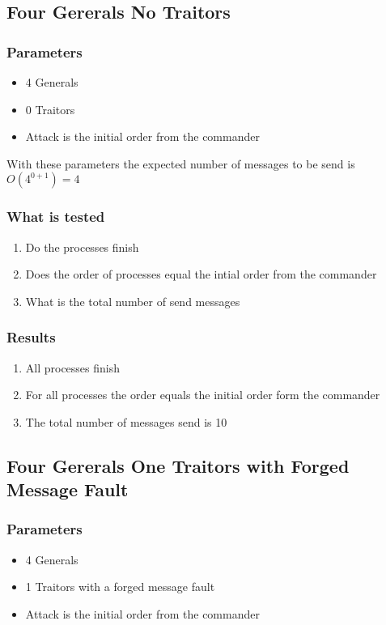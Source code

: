\documentclass[a4paper, notitlepage]{article}
\begin{document}
\subsection{Four Gererals No Traitors}

\subsubsection*{Parameters}
\begin{itemize}
\item 4 Generals
\item 0 Traitors
\item Attack is the initial order from the commander
\end{itemize}

With these parameters the expected number of messages to be send is \(O(4^{0+1}) = 4\)

\subsubsection*{What is tested}
\begin{enumerate}
\item Do the processes finish
\item Does the order of processes equal the intial order from the commander
\item What is the total number of send messages
\end{enumerate}

\subsubsection*{Results}
\begin{enumerate}
\item All processes finish
\item For all processes the order equals the initial order form the commander
\item The total number of messages send is 10
\end{enumerate}





\subsection{Four Gererals One Traitors with Forged Message Fault}

\subsubsection*{Parameters}
\begin{itemize}
\item 4 Generals
\item 1 Traitors with a forged message fault
\item Attack is the initial order from the commander
\end{itemize}
\end{document}
